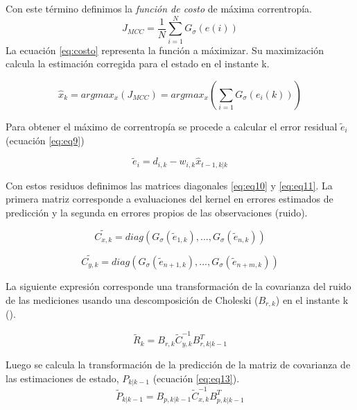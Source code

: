 Con este t\'ermino definimos la \textit{funci\'on de costo} de m\'axima correntrop\'ia.
\begin{equation}
J_{MCC} = \dfrac{1}{N} \sum_{i=1}^N G_{\sigma} (e (i))
\label{eq:costo}
\end{equation}
La ecuaci\'on \ref{eq:costo} representa la funci\'on a m\'aximizar. Su maximizaci\'on calcula la estimaci\'on corregida para el estado en el instante k.

\begin{equation}
\hat{x}_k = arg max_{x} (J_{MCC})= argmax_x (\sum_{i=1} G_{\sigma} (e_i(k)))
\label{eq:max}
\end{equation}
\bigskip

Para obtener el m\'aximo de correntrop\'ia se procede a calcular el error residual $\tilde{e}_i$ (ecuaci\'on \ref{eq:eq9})

\begin{equation}
\tilde{e}_i = d_{i,k} - w_{i,k} \hat{x}_{t-1, k|k}
\label{eq:eq9}
\end{equation}

Con estos residuos definimos las matrices diagonales \ref{eq:eq10} y \ref{eq:eq11}. La primera matriz corresponde a evaluaciones del kernel en errores estimados de predicci\'on y la segunda en errores propios de las observaciones (ruido).
\bigskip

\begin{equation}
\tilde{C_{x, k}}= diag(G_{\sigma}(\tilde{e}_{1, k}),..., G_{\sigma}(\tilde{e}_{n, k}))
\label{eq:eq10}
\end{equation}

\begin{equation}
\tilde{C_{y, k}}= diag(G_{\sigma}(\tilde{e}_{n+1, k}),..., G_{\sigma}(\tilde{e}_{n+m, k}))
\label{eq:eq11}
\end{equation}

La siguiente expresi\'on corresponde una transformaci\'on de la covarianza del ruido de las mediciones usando una descomposici\'on de Choleski ($B_{r, k}$) en el instante k (\cite{chen}).
\bigskip
 
\begin{equation}
\tilde{R}_k = B_{r, k} \tilde{C}_{y, k}^{-1}B_{r, k|k-1}^T 
\label{eq:eq12}
\end{equation}

Luego se calcula la transformaci\'on de la predicci\'on de la matriz de covarianza de las estimaciones de estado, $P_{k|k-1}$ (ecuaci\'on \ref{eq:eq13}).
\begin{equation}
\tilde{P}_{k|k-1} = B_{p, k|k-1} \tilde{C}_{x, k}^{-1}B_{p, k|k-1}^T
\label{eq:eq13}
\end{equation}


